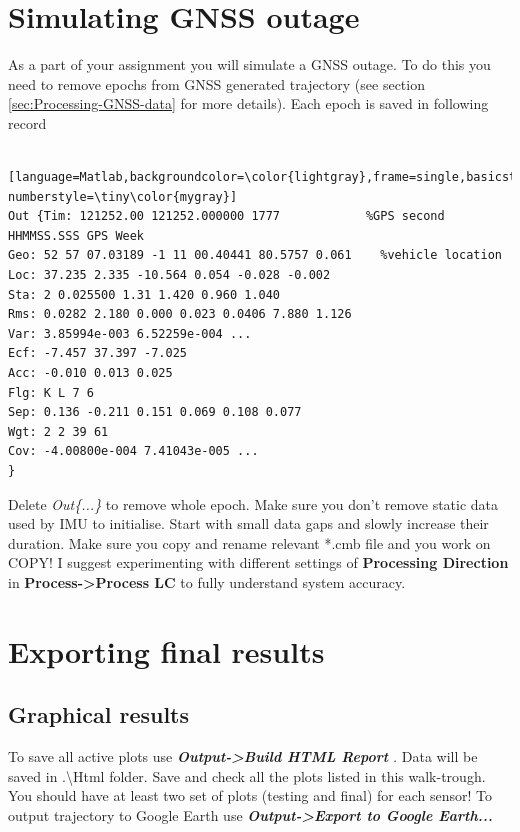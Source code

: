 \documentclass[british]{book}
\renewcommand{\footnotesize}{\scriptsize} %
\begin{document}
\section{Simulating GNSS outage\label{sec:Simulating-GNSS-outage}}

As a part of your assignment you will simulate a GNSS outage. To do this you need to remove epochs from GNSS generated trajectory (see section \ref{sec:Processing-GNSS-data} for more details). Each epoch is saved in following record

\begin{lstlisting} [language=Matlab,backgroundcolor=\color{lightgray},frame=single,basicstyle=\footnotesize,numbers=left,numbersep=5pt, numberstyle=\tiny\color{mygray}]
Out {Tim: 121252.00 121252.000000 1777 			  %GPS second HHMMSS.SSS GPS Week
Geo: 52 57 07.03189 -1 11 00.40441 80.5757 0.061 	%vehicle location
Loc: 37.235 2.335 -10.564 0.054 -0.028 -0.002 	
Sta: 2 0.025500 1.31 1.420 0.960 1.040 	
Rms: 0.0282 2.180 0.000 0.023 0.0406 7.880 1.126 	
Var: 3.85994e-003 6.52259e-004 ...	
Ecf: -7.457 37.397 -7.025 	
Acc: -0.010 0.013 0.025 	
Flg: K L 7 6 	
Sep: 0.136 -0.211 0.151 0.069 0.108 0.077 	
Wgt: 2 2 39 61 	
Cov: -4.00800e-004 7.41043e-005 ...
}
\end{lstlisting}

Delete \emph{Out\{...\}} to remove whole epoch. Make sure you don't remove static data used by IMU to initialise. Start with small data gaps and slowly increase their duration. Make sure you copy and rename relevant {*}.cmb file and you work on COPY! I suggest experimenting with different settings of \textbf{Processing Direction} in \textbf{Process->Process LC} to fully understand system accuracy.



\section{Exporting final results\label{sec:Exporting-final-results}}

\subsection{Graphical results}

To save all active plots use\textbf{\emph{ Output->Build HTML Report }}\emph{. }Data will be saved in .\textbackslash{}Html folder. Save and check all the plots listed in this walk-trough. You should have at least two set of plots (testing and final) for each sensor!  To output trajectory to Google Earth use\textbf{\emph{ Output->Export to Google Earth...}}
\end{document}
